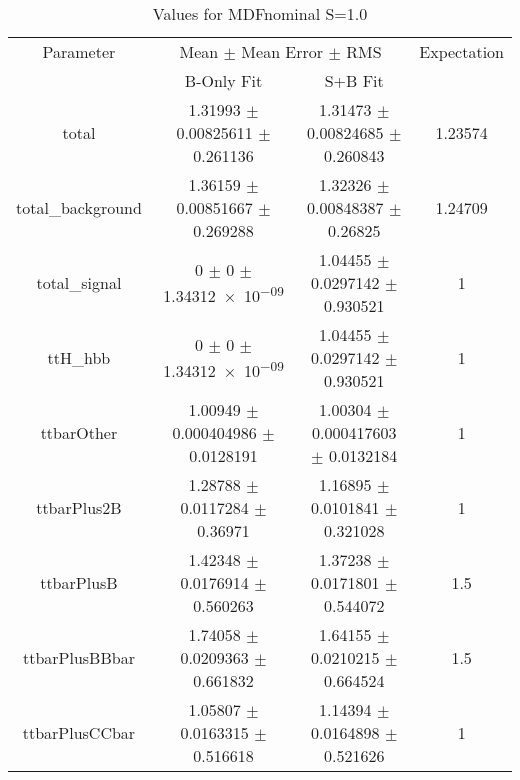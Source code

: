 \begin{table}
\centering
\caption{Values for MDFnominal S=1.0}
\begin{tabular}{cccc}
\toprule
Parameter & \multicolumn{2}{c}{Mean $\pm$ Mean Error $\pm$ RMS} & Expectation\\
 & B-Only Fit & S+B Fit & \\
\midrule
total & \num{1.31993} $\pm$ \num{0.00825611} $\pm$ \num{0.261136} & \num{1.31473} $\pm$ \num{0.00824685} $\pm$ \num{0.260843} & \num{1.23574}\\
total\_background & \num{1.36159} $\pm$ \num{0.00851667} $\pm$ \num{0.269288} & \num{1.32326} $\pm$ \num{0.00848387} $\pm$ \num{0.26825} & \num{1.24709}\\
total\_signal & \num{0} $\pm$ \num{0} $\pm$ \num{1.34312e-09} & \num{1.04455} $\pm$ \num{0.0297142} $\pm$ \num{0.930521} & \num{1}\\
ttH\_hbb & \num{0} $\pm$ \num{0} $\pm$ \num{1.34312e-09} & \num{1.04455} $\pm$ \num{0.0297142} $\pm$ \num{0.930521} & \num{1}\\
ttbarOther & \num{1.00949} $\pm$ \num{0.000404986} $\pm$ \num{0.0128191} & \num{1.00304} $\pm$ \num{0.000417603} $\pm$ \num{0.0132184} & \num{1}\\
ttbarPlus2B & \num{1.28788} $\pm$ \num{0.0117284} $\pm$ \num{0.36971} & \num{1.16895} $\pm$ \num{0.0101841} $\pm$ \num{0.321028} & \num{1}\\
ttbarPlusB & \num{1.42348} $\pm$ \num{0.0176914} $\pm$ \num{0.560263} & \num{1.37238} $\pm$ \num{0.0171801} $\pm$ \num{0.544072} & \num{1.5}\\
ttbarPlusBBbar & \num{1.74058} $\pm$ \num{0.0209363} $\pm$ \num{0.661832} & \num{1.64155} $\pm$ \num{0.0210215} $\pm$ \num{0.664524} & \num{1.5}\\
ttbarPlusCCbar & \num{1.05807} $\pm$ \num{0.0163315} $\pm$ \num{0.516618} & \num{1.14394} $\pm$ \num{0.0164898} $\pm$ \num{0.521626} & \num{1}\\
\bottomrule
\end{tabular}
\end{table}